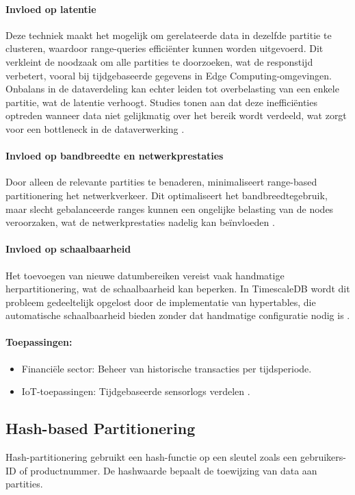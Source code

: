 \paragraph{Invloed op latentie} 
Deze techniek maakt het mogelijk om gerelateerde data in dezelfde partitie te clusteren, waardoor range-queries efficiënter kunnen worden uitgevoerd. Dit verkleint de noodzaak om alle partities te doorzoeken, wat de responstijd verbetert, vooral bij tijdgebaseerde gegevens in Edge Computing-omgevingen. Onbalans in de dataverdeling kan echter leiden tot overbelasting van een enkele partitie, wat de latentie verhoogt. Studies tonen aan dat deze inefficiënties optreden wanneer data niet gelijkmatig over het bereik wordt verdeeld, wat zorgt voor een bottleneck in de dataverwerking \autocite{Mahmud2020}.
 
\paragraph{Invloed op bandbreedte en netwerkprestaties} 
Door alleen de relevante partities te benaderen, minimaliseert range-based partitionering het netwerkverkeer. Dit optimaliseert het bandbreedtegebruik, maar slecht gebalanceerde ranges kunnen een ongelijke belasting van de nodes veroorzaken, wat de netwerkprestaties nadelig kan beïnvloeden \autocite{Mahmud2020}.
 
\paragraph{Invloed op schaalbaarheid} 
Het toevoegen van nieuwe datumbereiken vereist vaak handmatige herpartitionering, wat de schaalbaarheid kan beperken. In TimescaleDB wordt dit probleem gedeeltelijk opgelost door de implementatie van hypertables, die automatische schaalbaarheid bieden zonder dat handmatige configuratie nodig is \autocite{Mahmud2020}.
 
\paragraph{Toepassingen:}
\begin{itemize}
    \item Financiële sector: Beheer van historische transacties per tijdsperiode.
    \item IoT-toepassingen: Tijdgebaseerde sensorlogs verdelen \autocite{Mahmud2020}.
\end{itemize}
 
\subsection{Hash-based Partitionering}
Hash-partitionering gebruikt een hash-functie op een sleutel zoals een gebruikers-ID of productnummer. De hashwaarde bepaalt de toewijzing van data aan partities.
 
